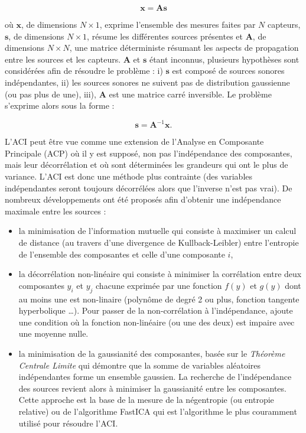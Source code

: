 \begin{equation}\label{eq:ACI2}
\mathbf{x} = \mathbf{As}
\end{equation}

où $\mathbf{x}$, de dimensions $N \times 1$, exprime l'ensemble des mesures faites par $N$ capteurs, $\mathbf{s}$, de dimensions $N \times 1$, résume les différentes sources présentes et $\mathbf{A}$, de dimensions $N \times N$, une matrice déterministe résumant les aspects de propagation entre les sources et les capteurs.
$\mathbf{A}$ et $\mathbf{s}$ étant inconnus, plusieurs hypothèses sont considérées afin de résoudre le problème : i) $\mathbf{s}$ est composé de sources sonores indépendantes, ii) les sources sonores ne suivent pas de distribution gaussienne (ou pas plus de une), iii), $\mathbf{A}$ est une matrice carré inversible. Le problème s'exprime alors sous la forme :

\begin{equation}
\mathbf{s} = \mathbf{A}^{-1}\mathbf{x}.
\end{equation}

L'ACI peut être vue comme une extension de l'Analyse en Composante Principale (ACP) où il y est supposé, non pas l'indépendance des composantes, mais leur décorrélation et où sont déterminées les grandeurs qui ont le plus de variance. L'ACI est donc une méthode plus contrainte (des variables indépendantes seront toujours décorrélées alors que l'inverse n'est pas vrai).
De nombreux développements ont été proposés afin d'obtenir une indépendance maximale entre les sources :

\begin{itemize}
\item la minimisation de l'information mutuelle \cite{hyvarinen97independentcomponent} qui consiste à maximiser un calcul de distance (au travers d'une divergence de Kullback-Leibler) entre l'entropie de l'ensemble des composantes et celle d'une composante $i$,
\item la décorrélation non-linéaire qui consiste à minimiser la corrélation entre deux composantes $y_i$ et $y_j$ chacune exprimée par une fonction $f(y)$ et $g(y)$ dont au moins une est non-linaire (polynôme de degré 2 ou plus, fonction tangente hyperbolique \dots). Pour passer de la non-corrélation à l'indépendance, \cite{jutten1991blind} ajoute une condition où la fonction non-linéaire (ou une des deux)  est impaire avec une moyenne nulle.
\item la minimisation de la \og gaussianité \fg{} des composantes, basée sur le \textit{Théorème Centrale Limite} qui démontre que la somme de variables aléatoires indépendantes forme un ensemble gaussien. La recherche de l'indépendance des sources revient alors à minimiser la \og gaussianité \fg{} entre les composantes. Cette approche est la base de la mesure de la négentropie (ou entropie relative) \cite{lee2000unifying} ou de l'algorithme FastICA \cite{hyvarinen1999fast} qui est l'algorithme le plus couramment utilisé pour résoudre l'ACI.
\end{itemize}

